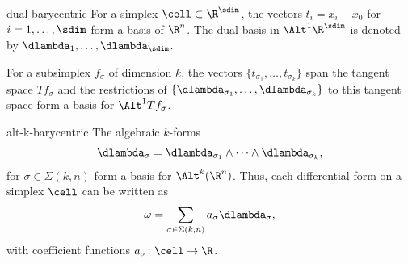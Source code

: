 \begin{Notation}{dual-barycentric}
  For a simplex $\cell\subset \R^\sdim$, the vectors $t_i = x_i-x_0$
  for $i=1,\dots,\sdim$ form a basis of $\R^n$. The dual basis in
  $\Alt^1\R^\sdim$ is denoted by $\dlambda_1,\dots,\dlambda_\sdim$.

  For a subsimplex $f_\sigma$ of dimension $k$, the vectors
  $\{t_{\sigma_1},\dots,t_{\sigma_k}\}$ span the tangent space
  $Tf_\sigma$ and the restrictions of $\{\dlambda_{\sigma_1},\dots,\dlambda_{\sigma_k}\}$ to this tangent space form a basis for $\Alt^1Tf_\sigma$.
\end{Notation}

\begin{Notation}{alt-k-barycentric}
  The algebraic $k$-forms
  \begin{gather}
    \dlambda_\sigma = \dlambda_{\sigma_1}\wedge\dots\wedge\dlambda_{\sigma_k},
  \end{gather}
  for $\sigma\in\Sigma(k,n)$ form a basis for $\Alt^k(\R^n)$. Thus,
  each differential form on a simplex $\cell$ can be written as
  \begin{gather}
    \omega = \sum_{\sigma\in\Sigma(k,n)} a_\sigma \dlambda_\sigma,
  \end{gather}
  with coefficient functions $a_\sigma\colon \cell\to \R$.
\end{Notation}



